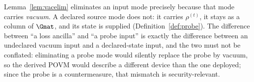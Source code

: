 
\begin{remark}
\label{rem:lossvsprobe}
Lemma~\ref{lem:vacelim} eliminates an input mode precisely because that mode
carries \emph{vacuum}. A declared source mode does not: it carries
$\rho^{(t)}$, it stays as a column of $\Gmat$, and its state is supplied
(Definition~\ref{def:probe}). The difference between ``a loss ancilla'' and ``a
probe input'' is exactly the difference between an undeclared vacuum input and
a declared-state input, and the two must not be conflated: eliminating a
probe mode would silently replace the probe by vacuum, so the derived POVM
would describe a different device than the one deployed; since the probe is
a countermeasure, that mismatch is security-relevant.
\end{remark}
